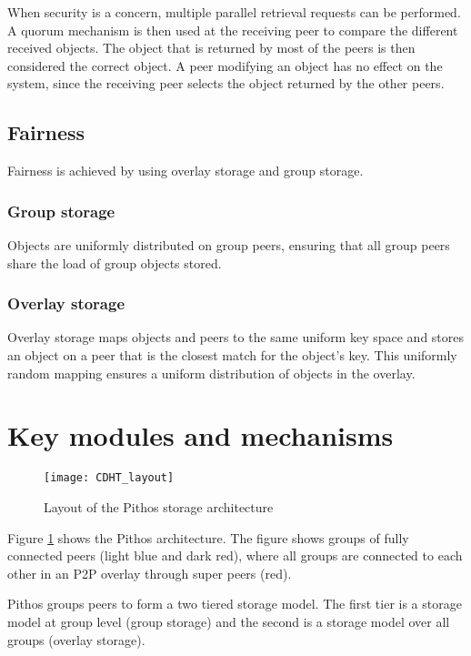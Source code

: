When security is a concern, multiple parallel retrieval requests can be performed. A quorum mechanism is then used at the receiving peer to compare the different received objects. The object that is returned by most of the peers is then considered the correct object. A peer modifying an object has no effect on the system, since the receiving peer selects the object returned by the other peers.

\subsection{Fairness}

Fairness is achieved by using overlay storage and group storage.

\subsubsection{Group storage}

Objects are uniformly distributed on group peers, ensuring that all group peers share the load of group objects stored.

\subsubsection{Overlay storage}

Overlay storage maps objects and peers to the same uniform key space and stores an object on a peer that is the closest match for the object's key. This uniformly random mapping ensures a uniform distribution of objects in the overlay.


\section{Key modules and mechanisms}

\begin{figure}[htbp]
 \centering
 \texttt{[image: CDHT\_layout]}
 \caption{Layout of the Pithos storage architecture}
 \label{fig_pithos}
\end{figure}
%
Figure \ref{fig_pithos} shows the Pithos architecture. The figure shows groups of fully connected peers (light blue and dark red), where all groups are connected to each other in an P2P overlay through super peers (red).

Pithos groups peers to form a two tiered storage model. The first tier is a storage model at group level (group storage) and the second is a storage model over all groups (overlay storage).

